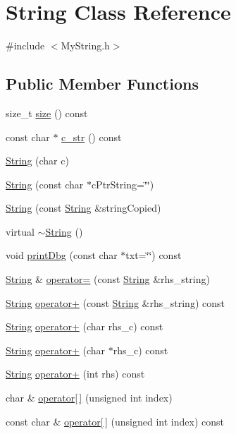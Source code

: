 \hypertarget{class_string}{}\section{String Class Reference}
\label{class_string}


{\ttfamily \#include $<$My\+String.\+h$>$}

\subsection*{Public Member Functions}
\begin{DoxyCompactItemize}
\item 
size\+\_\+t \mbox{\hyperlink{class_string_a588c5cc9faededbb9d938662d354feed}{size}} () const
\item 
const char $\ast$ \mbox{\hyperlink{class_string_a0274f3e61533d15086816fb7f47ccb54}{c\+\_\+str}} () const
\item 
\mbox{\hyperlink{class_string_a1fdfe981d2c5e0075c1669dd94553082}{String}} (char c)
\item 
\mbox{\hyperlink{class_string_a53f2ea0aea3b2544a85713e47d12bc6f}{String}} (const char $\ast$c\+Ptr\+String=\char`\"{}\char`\"{})
\item 
\mbox{\hyperlink{class_string_a3fee67296a8d2901d5fbc04ee56d15e4}{String}} (const \mbox{\hyperlink{class_string}{String}} \&string\+Copied)
\item 
virtual \mbox{\hyperlink{class_string_ac73850e459f183bdd3c172e506be2a32}{$\sim$\+String}} ()
\item 
void \mbox{\hyperlink{class_string_a2d2eef6db9c5a4e3fe4eda73b3ae2846}{print\+Dbg}} (const char $\ast$txt=\char`\"{}\char`\"{}) const
\item 
\mbox{\hyperlink{class_string}{String}} \& \mbox{\hyperlink{class_string_a71dbd70fd524c5193dac85c853695a12}{operator=}} (const \mbox{\hyperlink{class_string}{String}} \&rhs\+\_\+string)
\item 
\mbox{\hyperlink{class_string}{String}} \mbox{\hyperlink{class_string_a71bdf63295b700150845aebc2fe6eba0}{operator+}} (const \mbox{\hyperlink{class_string}{String}} \&rhs\+\_\+string) const
\item 
\mbox{\hyperlink{class_string}{String}} \mbox{\hyperlink{class_string_abb187e5ab66fe29c42aed4845b55dd76}{operator+}} (char rhs\+\_\+c) const
\item 
\mbox{\hyperlink{class_string}{String}} \mbox{\hyperlink{class_string_aaf1767dc1e01db12d0e183fa41eba2b7}{operator+}} (char $\ast$rhs\+\_\+c) const
\item 
\mbox{\hyperlink{class_string}{String}} \mbox{\hyperlink{class_string_a230ad695c7bc7be7c690d215d20e4210}{operator+}} (int rhs) const
\item 
char \& \mbox{\hyperlink{class_string_a92a0681d0031d7e99c12c245cc22367e}{operator\mbox{[}$\,$\mbox{]}}} (unsigned int index)
\item 
const char \& \mbox{\hyperlink{class_string_aa21521063bea848db1e3643f64d27887}{operator\mbox{[}$\,$\mbox{]}}} (unsigned int index) const
\end{DoxyCompactItemize}


